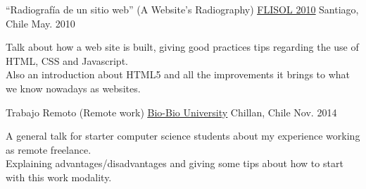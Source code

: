 

\begin{cventries}

  \cventry
    {“Radiografía de un sitio web” (A Website's Radiography)} %
    {\href{http://santiago.flisol.cl/}{\underline{FLISOL 2010}}} %
    {Santiago, Chile} %
    {May. 2010} %
    {
      \begin{cvitems} %
        \item {
          Talk about how a web site is built, giving good practices tips regarding the use of HTML, CSS and Javascript.\\
          Also an introduction about HTML5 and all the improvements it brings to what we know nowadays as websites.
        }
      \end{cvitems}
    }

  \cventry
    {Trabajo Remoto (Remote work)} %
    {\href{http://www.ubiobio.cl/}{\underline{Bio-Bio University}}} %
    {Chillan, Chile} %
    {Nov. 2014} %
    {
      \begin{cvitems} %
        \item {
          A general talk for starter computer science students about my experience working as remote freelance.\\
          Explaining advantages/disadvantages and giving some tips about how to start with this work modality.
        }
      \end{cvitems}
    }

\end{cventries}
